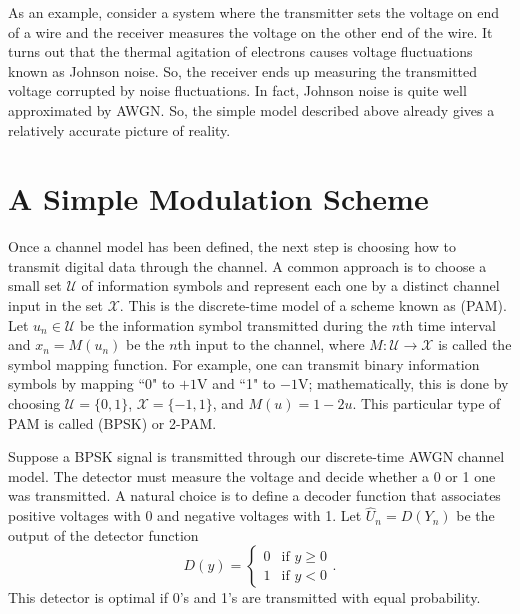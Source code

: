 As an example, consider a system where the transmitter sets the voltage on end of a wire and the receiver measures the voltage on the other end of the wire.
It turns out that the thermal agitation of electrons causes voltage fluctuations known as Johnson noise.
So, the receiver ends up measuring the transmitted voltage corrupted by noise fluctuations.
In fact, Johnson noise is quite well approximated by AWGN.
So, the simple model described above already gives a relatively accurate picture of reality.

\section{A Simple Modulation Scheme}

Once a channel model has been defined, the next step is choosing how to transmit digital data through the channel.
A common approach is to choose a small set $\mathcal{U}$ of information symbols and represent each one by a distinct channel input in the set $\mathcal{X}$.
This is the discrete-time model of a scheme known as  (PAM).
Let $u_n \in \mathcal{U}$ be the information symbol transmitted during the $n$th time interval and $x_n = M(u_n)$ be the $n$th input to the channel, where $M: \mathcal{U} \rightarrow \mathcal{X}$ is called the symbol mapping function.
For example, one can transmit binary information symbols by mapping ``0" to $+1$V and ``1" to $-1$V; mathematically, this is done by choosing $\mathcal{U}=\{0,1\}$, $\mathcal{X}=\{-1,1\}$, and $M(u) = 1-2u$.
This particular type of PAM is called  (BPSK) or 2-PAM.

Suppose a BPSK signal is transmitted through our discrete-time AWGN channel model.
The detector must measure the voltage and decide whether a 0 or 1 one was transmitted.
A natural choice is to define a decoder function that associates positive voltages with 0 and negative voltages with 1.
Let $\hat{U}_n = D(Y_n)$ be the output of the detector function
\[ D(y) = \begin{cases} 0 & \text{if }y\geq0 \\ 1 & \text{if }y<0 \end{cases}. \]
This detector is optimal if 0's and 1's are transmitted with equal probability.

